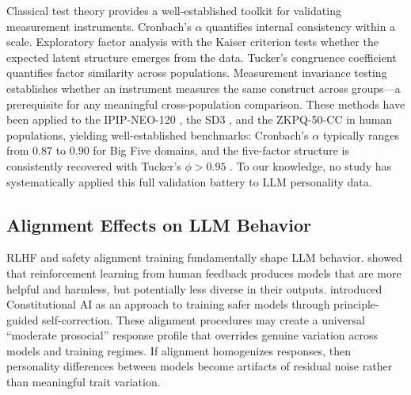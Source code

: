 Classical test theory provides a well-established toolkit for validating measurement instruments. Cronbach's $\alpha$ \citep{cronbach1951coefficient} quantifies internal consistency within a scale. Exploratory factor analysis with the Kaiser criterion \citep{kaiser1960application} tests whether the expected latent structure emerges from the data. Tucker's congruence coefficient \citep{tucker1951method} quantifies factor similarity across populations. Measurement invariance testing establishes whether an instrument measures the same construct across groups---a prerequisite for any meaningful cross-population comparison. These methods have been applied to the IPIP-NEO-120 \citep{johnson2014measuring}, the SD3 \citep{jones2014introducing}, and the ZKPQ-50-CC \citep{zuckerman2002zuckerman} in human populations, yielding well-established benchmarks: Cronbach's $\alpha$ typically ranges from $0.87$ to $0.90$ for Big Five domains, and the five-factor structure is consistently recovered with Tucker's $\phi > 0.95$ \citep{mccrae2005universal}. To our knowledge, no study has systematically applied this full validation battery to LLM personality data.

\subsection{Alignment Effects on LLM Behavior}

RLHF and safety alignment training fundamentally shape LLM behavior. \citet{ouyang2022training} showed that reinforcement learning from human feedback produces models that are more helpful and harmless, but potentially less diverse in their outputs. \citet{bai2022constitutional} introduced Constitutional AI as an approach to training safer models through principle-guided self-correction. These alignment procedures may create a universal ``moderate prosocial'' response profile that overrides genuine variation across models and training regimes. If alignment homogenizes responses, then personality differences between models become artifacts of residual noise rather than meaningful trait variation.
